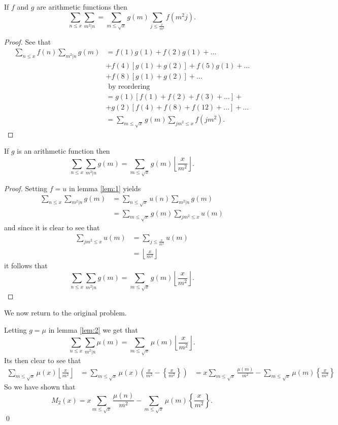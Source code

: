 \documentclass{unswmaths}
\begin{document}
\begin{lemma}
\label{lem:1}
If $ f $ and $ g $ are arithmetic functions then
$$
	\sum_{n\leq x} \sum_{m^2 |n} = \sum_{m\leq \sqrt{x}} g(m) \sum_{j \leq \frac{x}{m^2}} f(m^2j).
$$
\end{lemma}
\begin{proof}
	See that
	\begin{align*}
		\sum_{n\leq x}f(n) \sum_{m^2|n} g(m) &= f(1)g(1) + f(2)g(1) + \ldots \\
		&+ f(4)[ g(1) + g(2)] + f(5)g(1) + \ldots \\  
		&+ f(8)[g(1) + g(2)] + \ldots \\
			&\text{ by reordering } \\
			&= g(1)[ f(1) + f(2) + f(3) + \ldots ] + \\
				&+ g(2)[ f(4) + f(8) + f(12) + \ldots ] + \ldots \\
			&= \sum_{m \leq \sqrt{x}} g(m) \sum_{jm^2 \leq x}f(jm^2).
	\end{align*}
\end{proof}

\begin{lemma}
	\label{lem:2}
	If $ g $ is an arithmetic function then 
	$$
 		\sum_{n\leq x} \sum_{m^2|n} g(m) = \sum_{m\leq \sqrt{x}} g(m) \left\lfloor \frac{x}{m^2} \right\rfloor.
	$$
\end{lemma}
\begin{proof}	
	Setting $ f = u $ in lemma \ref{lem:1} yields
	\begin{align*}
		\sum_{n \leq x} \sum_{m^2|n} g(m) &= \sum_{n\leq \sqrt{x}} u(n) \sum_{m^2|n} g(m) \\
			&= \sum_{m \leq \sqrt{x}} g(m) \sum_{jm^2 \leq x} u(m)
	\end{align*}
	and since it is clear to see that 
	\begin{align*}
		\sum_{jm^2 \leq x} u(m) &= \sum_{j \leq \frac{x}{m^2}} u(m)  \\
			&= \left\lfloor \frac{x}{m^2} \right\rfloor 
	\end{align*}
	it follows that 
	$$
		\sum_{n\leq x} \sum_{m^2|n} g(m) = \sum_{m\leq \sqrt{x}} g(m) \left\lfloor \frac{x}{m^2} \right\rfloor.
	$$
\end{proof}

We now return to the original problem.

Letting $ g = \mu $ in lemma \ref{lem:2} we get that 
$$
	\sum_{n\leq x} \sum_{m^2 | n} \mu(m) = \sum_{m \leq{\sqrt{x}}} \mu(m) \left\lfloor \frac{x}{m^2} \right\rfloor.
$$
Its then clear to see that
\begin{align*}
	\sum_{m\leq \sqrt{x}} \mu(x) \left\lfloor \frac{x}{m^2} \right\rfloor &= \sum_{m \leq \sqrt{x}} \mu(x) \left( \frac{x}{m^2} - \left\{ \frac{x}{m^2} \right\} \right)
		&= x \sum_{m \leq \sqrt{x}} \frac{\mu(m)}{m^2} - \sum_{m \leq \sqrt{x}} \mu(m) \left\{ \frac{x}{m^2} \right\}
\end{align*}
So we have shown that
$$ 
    M_2(x) = x \sum_{m \leq \sqrt{x}} \frac{\mu(n)}{m^2} - \sum_{m \leq \sqrt{x}} \mu(m) \left\{ \frac{x}{m^2} \right\}. 
$$ \qed
\end{document}
